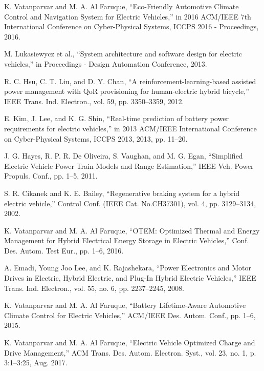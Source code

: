

K. Vatanparvar and M. A. Al Faruque, ``Eco-Friendly Automotive Climate Control and Navigation System for Electric Vehicles,'' in 2016 ACM/IEEE 7th International Conference on Cyber-Physical Systems, ICCPS 2016 - Proceedings, 2016.

M. Lukasiewycz et al., ``System architecture and software design for electric vehicles,'' in Proceedings - Design Automation Conference, 2013.

R. C. Hsu, C. T. Liu, and D. Y. Chan, ``A reinforcement-learning-based assisted power management with QoR provisioning for human-electric hybrid bicycle,'' IEEE Trans. Ind. Electron., vol. 59, pp. 3350–3359, 2012.


E. Kim, J. Lee, and K. G. Shin, ``Real-time prediction of battery power requirements for electric vehicles,'' in 2013 ACM/IEEE International Conference on Cyber-Physical Systems, ICCPS 2013, 2013, pp. 11–20.

J. G. Hayes, R. P. R. De Oliveira, S. Vaughan, and M. G. Egan, ``Simplified Electric Vehicle Power Train Models and Range Estimation,'' IEEE Veh. Power Propuls. Conf., pp. 1–5, 2011.

S. R. Cikanek and K. E. Bailey, ``Regenerative braking system for a hybrid electric vehicle,'' Control Conf. (IEEE Cat. No.CH37301), vol. 4, pp. 3129–3134, 2002.

K. Vatanparvar and M. A. Al Faruque, ``OTEM: Optimized Thermal and Energy Management for Hybrid Electrical Energy Storage in Electric Vehicles,'' Conf. Des. Autom. Test Eur., pp. 1–6, 2016.

A. Emadi, Young Joo Lee, and K. Rajashekara, ``Power Electronics and Motor Drives in Electric, Hybrid Electric, and Plug-In Hybrid Electric Vehicles,'' IEEE Trans. Ind. Electron., vol. 55, no. 6, pp. 2237–2245, 2008.

K. Vatanparvar and M. A. Al Faruque, ``Battery Lifetime-Aware Automotive Climate Control for Electric Vehicles,'' ACM/IEEE Des. Autom. Conf., pp. 1–6, 2015.	

K. Vatanparvar and M. A. Al Faruque, ``Electric Vehicle Optimized Charge and Drive Management,'' ACM Trans. Des. Autom. Electron. Syst., vol. 23, no. 1, p. 3:1--3:25, Aug. 2017.

